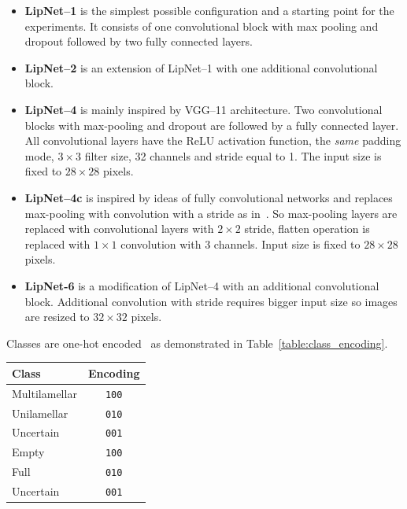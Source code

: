 \documentclass[a4paper, 11pt, table]{article}
\begin{document}
\begin{itemize}
\item \textbf{LipNet--1} is the simplest possible configuration and a starting point for the experiments. It consists of one convolutional block with max pooling and dropout followed by two fully connected layers.

\item \textbf{LipNet--2} is an extension of LipNet--1 with one additional convolutional block. 

\item \textbf{LipNet--4} is mainly inspired by VGG--11 architecture. Two convolutional blocks with max-pooling and dropout are followed by a fully connected layer. All convolutional layers have the ReLU activation function, the \textit{same} padding mode, $3 \times 3$ filter size, 32 channels and stride equal to 1. The input size is fixed to $28 \times 28$ pixels.

\item \textbf{LipNet--4c} is inspired by ideas of fully convolutional networks and replaces max-pooling with convolution with a stride as in~\cite{DBLP:journals/corr/SpringenbergDBR14}. So max-pooling layers are replaced with convolutional layers with $2 \times 2$ stride, flatten operation is replaced with $1 \times 1$ convolution with $3$ channels. Input size is fixed to $28 \times 28$ pixels.

\item \textbf{LipNet-6} is a modification of LipNet--4 with an additional convolutional block. Additional convolution with stride requires bigger input size so images are resized to $32 \times 32$ pixels. 
\end{itemize}

Classes are one-hot encoded~\cite{harris2013digital} as demonstrated in Table~\ref{table:class_encoding}.

\begin{center}
\label{table:class_encoding}
\begin{tabular}{|lc|}
\toprule 
Class & Encoding \\ 
\midrule 
Multilamellar & \texttt{100} \\ 
Unilamellar & \texttt{010} \\ 
Uncertain & \texttt{001} \\ 
\midrule 
Empty & \texttt{100} \\ 
Full & \texttt{010} \\ 
Uncertain & \texttt{001} \\ 
\bottomrule 
\end{tabular} 
\end{center}
\end{document}
